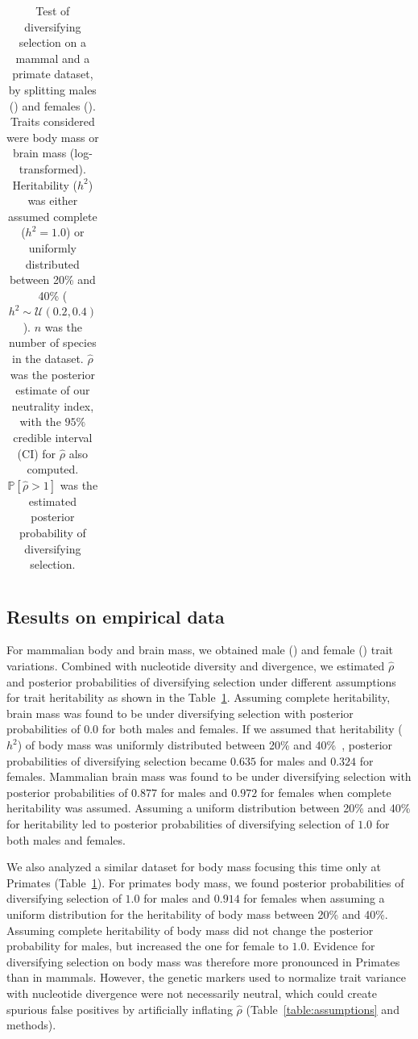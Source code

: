 \documentclass{article}
\newcommand{\proba}{\mathbb{P}}
\newcommand{\NbrTaxa}{n}
\newcommand{\Heritability}{h^2}
\newcommand{\EstNI}{\widehat{\rho}}
\begin{document}
\begin{table}[t!]
\begin{adjustbox}{width = 0.75\textwidth}
\begin{tabular}{||l|l|l|c|c|c|c|c||}
        \bottomrule
        \end{tabular}
    \end{adjustbox}
    \caption{
    Test of diversifying selection on a mammal and a primate dataset, by splitting males (\Male) and females (\Female).
    Traits considered were body mass or brain mass (log-transformed).
    Heritability ($\Heritability$) was either assumed complete ($\Heritability=1.0$) or uniformly distributed between 20\% and 40\%  ($\Heritability \sim \mathcal{U}(0.2, 0.4)$).
    $\NbrTaxa$ was the number of species in the dataset.
    $\EstNI$ was the posterior estimate of our neutrality index, with the $95\%$ credible interval (CI) for $\EstNI$ also computed.
    $\proba [\EstNI > 1 ]$ was the estimated posterior probability of diversifying selection.
    }
    \label{table:empirical}
\end{table}

\subsection{Results on empirical data}\label{subsec:results-on-empirical-data}

For mammalian body and brain mass, we obtained male (\Male) and female (\Female) trait variations.
Combined with nucleotide diversity and divergence, we estimated $\EstNI$ and posterior probabilities of diversifying selection under different assumptions for trait heritability as shown in the Table~\ref{table:empirical}.
Assuming complete heritability, brain mass was found to be under diversifying selection with posterior probabilities of $0.0$ for both males and females.
If we assumed that heritability ($\Heritability$) of body mass was uniformly distributed between 20\% and 40\%~\parencite{hu_bringing_2022}, posterior probabilities of diversifying selection became $0.635$ for males and $0.324$ for females.
Mammalian brain mass was found to be under diversifying selection with posterior probabilities of $0.877$ for males and $0.972$ for females when complete heritability was assumed.
Assuming a uniform distribution between 20\% and 40\% for heritability led to posterior probabilities of diversifying selection of $1.0$ for both males and females.

We also analyzed a similar dataset for body mass focusing this time only at Primates (Table~\ref{table:empirical}).
For primates body mass, we found posterior probabilities of diversifying selection of $1.0$ for males and $0.914$ for females when assuming a uniform distribution for the heritability of body mass between 20\% and 40\%.
Assuming complete heritability of body mass did not change the posterior probability for males, but increased the one for female to $1.0$.
Evidence for diversifying selection on body mass was therefore more pronounced in Primates than in mammals.
However, the genetic markers used to normalize trait variance with nucleotide divergence were not necessarily neutral, which could create spurious false positives by artificially inflating $\EstNI$ (Table~\ref{table:assumptions} and methods).
\end{document}
